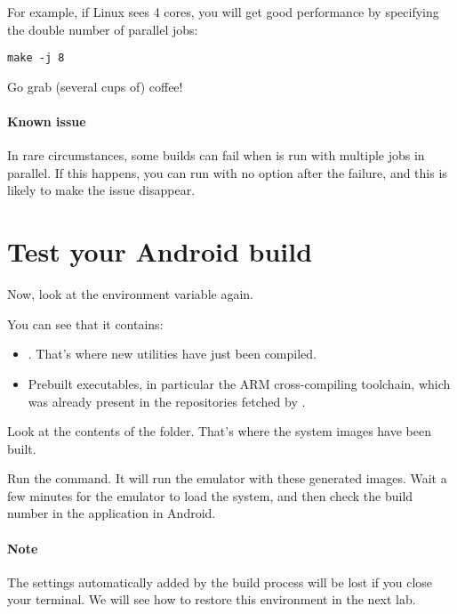 For example, if Linux sees 4 cores, you will get good performance by
specifying the double number of parallel jobs:

\begin{verbatim}
make -j 8
\end{verbatim}

Go grab (several cups of) coffee!

\paragraph{Known issue}
In rare circumstances, some builds can fail when  is run
with multiple jobs in parallel. If this happens, you can run
 with no option after the failure, and this is likely to
make the issue disappear.

\section{Test your Android build}

Now, look at the  environment variable again.

You can see that it contains:
\begin{itemize}
\item
  .
  That's where new utilities have just been compiled.
\item Prebuilt executables, in particular the ARM cross-compiling
  toolchain, which was already present in the repositories fetched by
  .
\end{itemize}

Look at the contents of the  folder.
That's where the system images have been built.

Run the  command. It will run the emulator with these
generated images.  Wait a few minutes for the emulator to load the
system, and then check the build number in the 
application in Android.

\paragraph{Note}
The  settings automatically added by the build process will
be lost if you close your terminal. We will see how to restore this
environment in the next lab.
